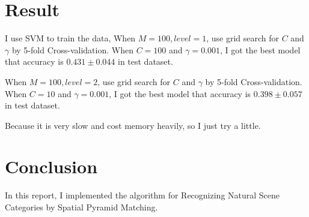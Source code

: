 \documentclass[10pt,twocolumn,letterpaper]{article}
\begin{document}
\section{Result}
I use SVM to train the data, When $M = 100, level = 1$, use grid search for $C$ and $\gamma$ by 5-fold Cross-validation. When $C = 100$ and $\gamma = 0.001$, I got the best model that accuracy is $0.431\pm 0.044$ in test dataset.\\
\par When $M = 100, level = 2$, use grid search for $C$ and $\gamma$ by 5-fold Cross-validation. When $C = 10$ and $\gamma = 0.001$, I got the best model that accuracy is $0.398\pm 0.057$ in test dataset.\\
\par Because it is very slow and cost memory heavily, so I just try a little.

\section{Conclusion}
In this report, I implemented the algorithm for Recognizing Natural Scene Categories by Spatial Pyramid Matching. 

{\small


}
\end{document}

